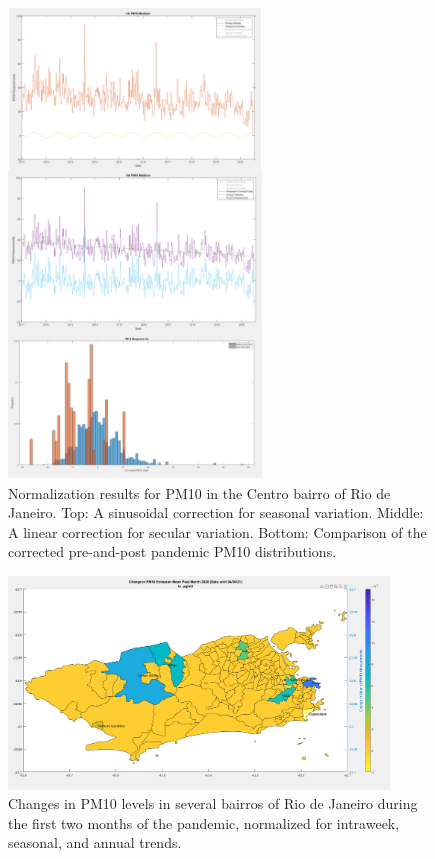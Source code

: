 \begin{figure}[H]
\centering
\includegraphics[width=0.6\textwidth]{Figures/chap5/aq-combined.png}
\caption[PM10 Normalization for the Centro bairro of Rio de Janeiro]{Normalization results for PM10 in the Centro bairro of Rio de Janeiro. Top: A sinusoidal correction for seasonal variation. Middle: A linear correction for secular variation. Bottom: Comparison of the corrected pre-and-post pandemic PM10 distributions.}
\label{fig:aq-combined}
\end{figure}


\begin{figure}[!htb]
\centering
\includegraphics[width=0.9\textwidth]{Figures/chap5/pm10.png}
\caption[Changes in PM10 in Rio de Janeiro]{Changes in PM10 levels in several bairros of Rio de Janeiro during the first two months of the pandemic, normalized for intraweek, seasonal, and annual trends.}
\label{fig:pm}
\end{figure}

